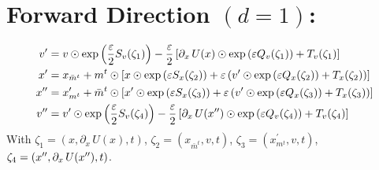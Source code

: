 \section{Forward Direction \texorpdfstring{$(d = 1)$}{(d = 1)}:}%
\label{sec:lf_forward}
\begin{align}
  \vp &= v \odot \exp{\left(\frac{\eps}{2}S_{v}(\zeta_{1})\right)}%
        - \frac{\eps}{2}\left[\partial_{x}\,U(x)\odot \exp{\left(\eps
          Q_{v}(\zeta_{1})\right)}%
        + T_{v}(\zeta_{1})\right] \\
  \xp &= x_{\bar{m}^{t}} + m^{t}\odot \left[x \odot \exp{\left(\eps
    S_{x}(\zeta_{2})\right)}%
        + \eps\left(\vp\odot\exp{\left(\eps Q_{x}(\zeta_{2})\right)} 
          + T_{x}(\zeta_{2})\right)\right] \\
  \xpp &= x^{\prime}_{m^{t}} + \bar{m}^{t}\odot \left[\xp \odot \exp{\left(\eps
    S_{x}(\zeta_{3})\right)}%
        + \eps\left(\vp\odot\exp{\left(\eps Q_{x}(\zeta_{3})\right)} +
      T_{x}(\zeta_{3})\right)\right] \\
  \vpp &= \vp \odot \exp{\left(\frac{\eps}{2}S_{v}(\zeta_{4})\right)}%
        - \frac{\eps}{2}\left[\partial_{x}\,U(\xpp)\odot \exp{\left(\eps
          Q_{v}(\zeta_{4})\right)}%
          + T_{v}(\zeta_{4})\right]
\label{eq:forward_update}
\end{align} 
%
With $\zeta_{1} = (x, \partial_{x}\, U(x), t)$, $\zeta_{2} = (x_{\bar{m}^{t}},
v, t)$, $\zeta_{3} = (x^{\prime}_{m^{t}}, v, t)$, $\zeta_{4} = ({x^{\prime\prime}},
\partial_{x}\, U({x^{\prime\prime}}), t)$.
%
